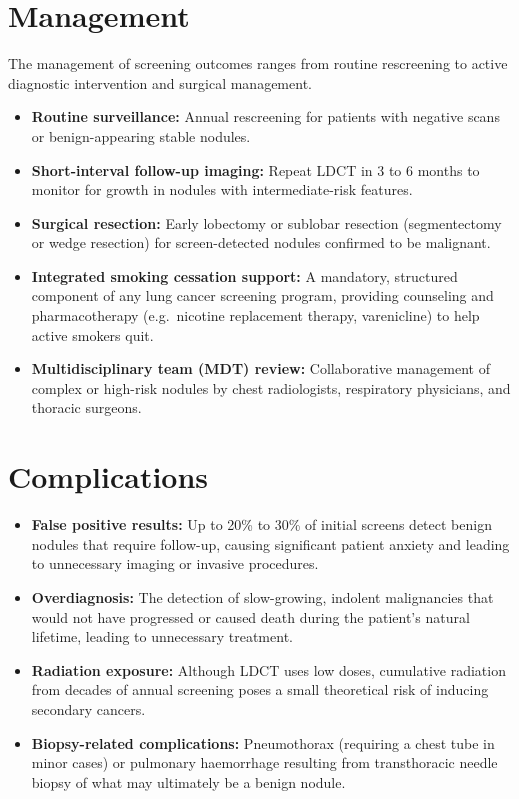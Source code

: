 \section*{Management}
The management of screening outcomes ranges from routine rescreening to active diagnostic intervention and surgical management.
\begin{itemize}
    \item \textbf{Routine surveillance:} Annual rescreening for patients with negative scans or benign-appearing stable nodules.
    \item \textbf{Short-interval follow-up imaging:} Repeat LDCT in 3 to 6 months to monitor for growth in nodules with intermediate-risk features.
    \item \textbf{Surgical resection:} Early lobectomy or sublobar resection (segmentectomy or wedge resection) for screen-detected nodules confirmed to be malignant.
    \item \textbf{Integrated smoking cessation support:} A mandatory, structured component of any lung cancer screening program, providing counseling and pharmacotherapy (e.g.\ nicotine replacement therapy, varenicline) to help active smokers quit.
    \item \textbf{Multidisciplinary team (MDT) review:} Collaborative management of complex or high-risk nodules by chest radiologists, respiratory physicians, and thoracic surgeons.
\end{itemize}

\section*{Complications}
\begin{itemize}
    \item \textbf{False positive results:} Up to 20\% to 30\% of initial screens detect benign nodules that require follow-up, causing significant patient anxiety and leading to unnecessary imaging or invasive procedures.
    \item \textbf{Overdiagnosis:} The detection of slow-growing, indolent malignancies that would not have progressed or caused death during the patient's natural lifetime, leading to unnecessary treatment.
    \item \textbf{Radiation exposure:} Although LDCT uses low doses, cumulative radiation from decades of annual screening poses a small theoretical risk of inducing secondary cancers.
    \item \textbf{Biopsy-related complications:} Pneumothorax (requiring a chest tube in minor cases) or pulmonary haemorrhage resulting from transthoracic needle biopsy of what may ultimately be a benign nodule.
\end{itemize}

